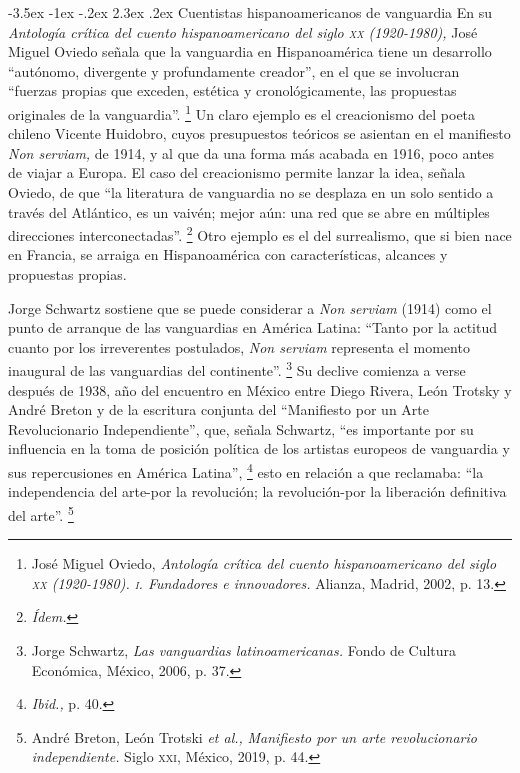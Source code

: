 \documentclass[14pt,twoside,final]{extbook} %
\makeatletter
\let\oldfootnote\footnote
\renewcommand\footnote[1]{%
\oldfootnote{\hspace{1mm}#1}}
\renewcommand\section{\@startsection {section}{1}{\z@}%
                                     {-3.5ex \@plus -1ex \@minus -.2ex}%
                                     {2.3ex \@plus .2ex}%
                                     {\normalfont\large\bfseries\sc}}
\makeatother
\begin{document}
\section{Cuentistas hispanoamericanos de vanguardia}\label{sec:cuentistas-hispanoamericanos-de-vanguardia}
En su \emph{Antología crítica del cuento hispanoamericano del siglo \textsc{xx} (1920-1980),} José Miguel Oviedo señala que la vanguardia en Hispanoamérica tiene un desarrollo ``autónomo, divergente y profundamente creador'', en el que se involucran ``fuerzas propias que exceden, estética y cronológicamente, las propuestas originales de la vanguardia''.\footnote{José Miguel Oviedo, \emph{Antología crítica del cuento hispanoamericano del siglo \textsc{xx} (1920-1980). \textsc{i}. Fundadores e innovadores.} Alianza, Madrid, 2002, p. 13.} Un claro ejemplo es el creacionismo del poeta chileno Vicente Huidobro, cuyos presupuestos teóricos se asientan en el manifiesto \emph{Non serviam,} de 1914, y al que da una forma más acabada en 1916, poco antes de viajar a Europa. El caso del creacionismo permite lanzar la idea, señala Oviedo, de que ``la literatura de vanguardia no se desplaza en un solo sentido a través del Atlántico, es un vaivén; mejor aún: una red que se abre en múltiples direcciones interconectadas''.\footnote{\em Ídem.} Otro ejemplo es el del surrealismo, que si bien nace en Francia, se arraiga en Hispanoamérica con características, alcances y propuestas propias.

Jorge Schwartz sostiene que se puede considerar a \emph{Non serviam} (1914) como el punto de arranque de las vanguardias en América Latina: ``Tanto por la actitud cuanto por los irreverentes postulados, \emph{Non serviam} representa el momento inaugural de las vanguardias del continente''.\footnote{Jorge Schwartz, \emph{Las vanguardias latinoamericanas.} Fondo de Cultura Económica, México, 2006, p. 37.} Su declive comienza a verse después de 1938, año del encuentro en México entre Diego Rivera, León Trotsky y André Breton y de la escritura conjunta del ``Manifiesto por un Arte Revolucionario Independiente'', que, señala Schwartz, ``es importante por su influencia en la toma de posición política de los artistas europeos de vanguardia y sus repercusiones en América Latina'',\footnote{\emph{Ibid.,} p. 40.} esto en relación a que reclamaba: ``la independencia del arte-por la revolución; la revolución-por la liberación definitiva del arte''.\footnote{André Breton, León Trotski \emph{et al.,} \emph{Manifiesto por un arte revolucionario independiente.} Siglo \textsc{xxi}, México, 2019, p. 44.}
\end{document}
